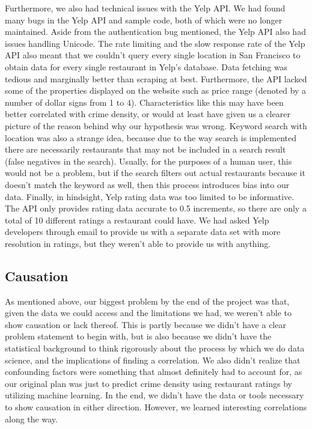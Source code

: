 \documentclass{article}
\begin{document}
Furthermore, we also had technical issues with the Yelp API. We had found
many bugs in the Yelp API and sample code, both of which were no longer
maintained. Aside from the authentication bug mentioned, the Yelp API also
had issues handling Unicode. The rate limiting and the slow response rate
of the Yelp API also meant that we couldn't query every single location in
San Francisco to obtain data for every single restaurant in Yelp's
database. Data fetching was tedious and marginally better than scraping at
best. Furthermore, the API lacked some of the properties displayed on the
website such as price range (denoted by a number of dollar signs from 1 to
4). Characteristics like this may have been better correlated with crime
density, or would at least have given us a clearer picture of the reason
behind why our hypothesis was wrong. Keyword search with location was also
a strange idea, because due to the way search is implemented there are
necessarily restaurants that may not be included in a search result (false
negatives in the search). Usually, for the purposes of a human user, this
would not be a problem, but if the search filters out actual restaurants
because it doesn't match the keyword as well, then this process introduces
bias into our data. Finally, in hindsight, Yelp rating data was too limited
to be informative. The API only provides rating data accurate to 0.5
increments, so there are only a total of 10 different ratings a restaurant
could have. We had asked Yelp developers through email to provide us with a
separate data set with more resolution in ratings, but they weren't able to
provide us with anything.

\subsection{Causation}

As mentioned above, our biggest problem by the end of the project was that,
given the data we could access and the limitations we had, we weren't able
to show causation or lack thereof. This is partly because we didn't have a
clear problem statement to begin with, but is also because we didn't have
the statistical background to think rigorously about the process by which
we do data science, and the implications of finding a correlation. We also
didn't realize that confounding factors were something that almost
definitely had to account for, as our original plan was just to predict
crime density using restaurant ratings by utilizing machine learning. In
the end, we didn't have the data or tools necessary to show causation in
either direction. However, we learned interesting correlations along the
way.
\end{document}
